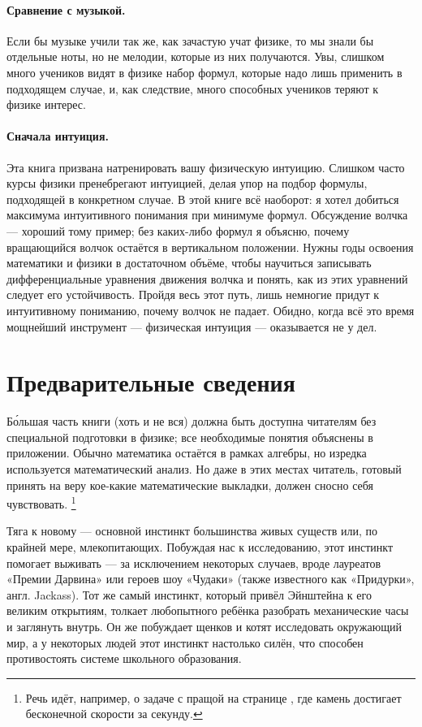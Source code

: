 \paragraph{Сравнение с музыкой.}
Если бы музыке учили так же, как зачастую учат физике, то мы знали бы отдельные ноты, но не мелодии, которые из них получаются.
Увы, слишком много учеников видят в физике набор формул, которые надо лишь применить в подходящем случае, и,
как следствие, много способных учеников теряют к физике интерес.

\paragraph{Сначала интуиция.}
Эта книга призвана натренировать вашу физическую интуицию.
Слишком часто курсы физики пренебрегают интуицией, делая упор на подбор формулы, подходящей в конкретном случае.
В этой книге всё наоборот:
я хотел добиться максимума интуитивного понимания при минимуме формул.
Обсуждение волчка --- хороший тому пример;
без каких-либо формул я объясню, почему вращающийся волчок остаётся в вертикальном положении.
Нужны годы освоения математики и физики в достаточном объёме, чтобы научиться записывать дифференциальные уравнения движения волчка и понять, как из этих уравнений следует его устойчивость.
Пройдя весь этот путь, лишь немногие придут к интуитивному пониманию, почему волчок не падает.
Обидно, когда всё это время мощнейший инструмент --- физическая интуиция --- оказывается не у дел.

\section{Предварительные сведения}

Б\'{о}льшая часть книги (хоть и не вся) должна быть доступна читателям без специальной подготовки в физике;
все необходимые понятия объяснены в приложении.
Обычно математика остаётся в рамках алгебры, но изредка используется математический анализ.
Но даже в этих местах читатель, готовый принять на веру кое-какие математические выкладки, должен сносно себя чувствовать.%
\footnote{Речь идёт, например, о задаче с пращой на странице \pageref{Задача Давида и Голиафа}, где камень достигает бесконечной скорости за секунду.}

Тяга к новому --- основной инстинкт большинства живых существ или, по крайней мере, млекопитающих.
Побуждая нас к исследованию, этот инстинкт помогает выживать --- за исключением некоторых случаев, вроде лауреатов «Премии Дарвина» или героев шоу «Чудаки» (также известного как «Придурки», англ. Jackass).
Тот же самый инстинкт, который привёл Эйнштейна к его великим открытиям, толкает любопытного ребёнка разобрать механические часы и заглянуть внутрь.
Он же побуждает щенков и котят исследовать окружающий мир,
а у некоторых людей этот инстинкт настолько силён, что способен противостоять системе школьного образования.

